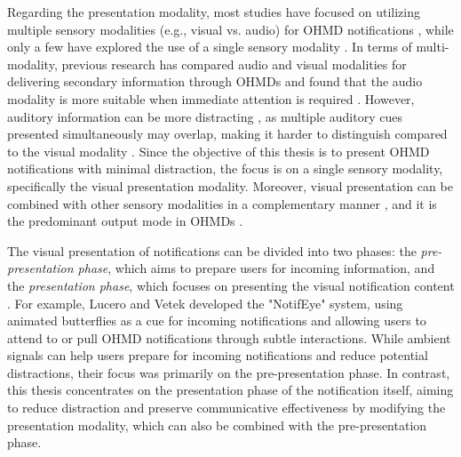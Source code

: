 Regarding the presentation modality, most studies have focused on utilizing multiple sensory modalities (e.g., visual vs. audio) for OHMD notifications \cite{ofek_reducing_2013, farve_user_2016, damian_augmenting_2015, cidota_workspace_2016}, while only a few have explored the use of a single sensory modality \cite{lucero_notifeye_2014, tanveer_rhema_2015}. In terms of multi-modality, previous research \cite{ofek_reducing_2013, cidota_workspace_2016} has compared audio and visual modalities for delivering secondary information through OHMDs and found that the audio modality is more suitable when immediate attention is required \cite{farve_user_2016}. However, auditory information can be more distracting \cite{ofek_reducing_2013}, as multiple auditory cues presented simultaneously may overlap, making it harder to distinguish compared to the visual modality \cite{cidota_workspace_2016}.
Since the objective of this thesis is to present OHMD notifications with minimal distraction, the focus is on a single sensory modality, specifically the visual presentation modality. Moreover, visual presentation can be combined with other sensory modalities in a complementary manner \cite{rau_modality_2019}, and it is the predominant output mode in OHMDs \cite{itoh_towards_2021}.

The visual presentation of notifications can be divided into two phases: the \textit{pre-presentation phase}, which aims to prepare users for incoming information, and the \textit{presentation phase}, which focuses on presenting the visual notification content \cite{lucero_notifeye_2014, tanveer_rhema_2015, stokes_dominance_2015}.
For example, Lucero and Vetek \cite{lucero_notifeye_2014} developed the "NotifEye" system, using animated butterflies as a cue for incoming notifications and allowing users to attend to or pull OHMD notifications through subtle interactions.
While ambient signals can help users prepare for incoming notifications and reduce potential distractions, their focus was primarily on the pre-presentation phase. In contrast, this thesis concentrates on the presentation phase of the notification itself, aiming to reduce distraction and preserve communicative effectiveness by modifying the presentation modality, which can also be combined with the pre-presentation phase.

